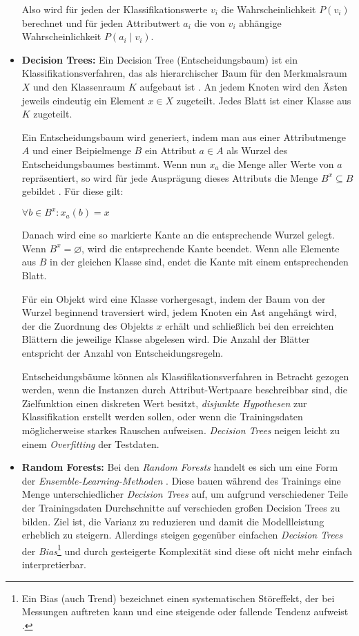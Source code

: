 \begin{itemize}
Also wird für jeden der Klassifikationswerte \(v_i\) die Wahrscheinlichkeit \(P(v_i)\) berechnet und für jeden Attributwert \(a_i\) die von \(v_i\) abhängige Wahrscheinlichkeit \(P(a_i \mid v_i)\).  

\item \textbf{Decision Trees:} Ein Decision Tree (Entscheidungsbaum) ist ein Klassifikationsverfahren, das als hierarchischer Baum für den Merkmalsraum \(X\) und den Klassenraum \(K\) aufgebaut ist . An jedem Knoten wird den Ästen jeweils eindeutig ein Element \(x \in X\) zugeteilt. Jedes Blatt ist einer Klasse aus  \(K\) zugeteilt. 

Ein Entscheidungsbaum wird generiert, indem man aus einer Attributmenge \(A\) und einer Beipielmenge \(B\) ein Attribut \(a \in A\) als Wurzel des Entscheidungsbaumes bestimmt. Wenn nun \(x_a\) die Menge aller Werte von  \(a\) repräsentiert, so wird für jede Ausprägung dieses Attributs die Menge \(B^x \subseteq B\) gebildet . Für diese gilt:

\(\forall b \in B^x : x_a(b)=x\)

Danach wird eine so markierte Kante an die entsprechende Wurzel gelegt. Wenn \(B^x = \varnothing \), wird die entsprechende Kante beendet. 
Wenn alle Elemente aus  \(B\) in der gleichen Klasse sind, endet die Kante mit einem entsprechenden Blatt.

Für ein Objekt wird eine Klasse vorhergesagt, indem der Baum von der Wurzel beginnend traversiert wird, jedem Knoten ein Ast angehängt wird, der die Zuordnung des Objekts \(x\) erhält und schließlich bei den erreichten Blättern die jeweilige Klasse abgelesen wird. Die Anzahl der Blätter entspricht der Anzahl von Entscheidungsregeln. 

Entscheidungsbäume können als Klassifikationsverfahren in Betracht gezogen werden, wenn die Instanzen durch Attribut-Wertpaare beschreibbar sind, die Zielfunktion einen diskreten Wert besitzt, \textit{disjunkte Hypothesen} zur Klassifikation erstellt werden sollen, oder wenn die Trainingsdaten möglicherweise starkes Rauschen aufweisen. \textit{Decision Trees} neigen leicht zu einem \textit{Overfitting} der Testdaten.

\item \textbf{Random Forests:}  Bei den \textit{Random Forests} handelt es sich um eine Form der \textit{Ensemble-Learning-Methoden} . Diese bauen während des Trainings eine Menge unterschiedlicher \textit{Decision Trees} auf, um aufgrund verschiedener Teile der Trainingsdaten Durchschnitte auf verschieden großen Decision Trees zu bilden. Ziel ist, die Varianz zu reduzieren und damit die Modellleistung erheblich zu steigern. Allerdings steigen gegenüber einfachen \textit{Decision Trees} der \textit{Bias}\footnote{Ein Bias (auch Trend) bezeichnet einen systematischen Störeffekt, der bei Messungen auftreten kann und eine steigende oder fallende Tendenz aufweist .} und durch gesteigerte Komplexität sind diese oft nicht mehr einfach interpretierbar.  



\end{itemize}




